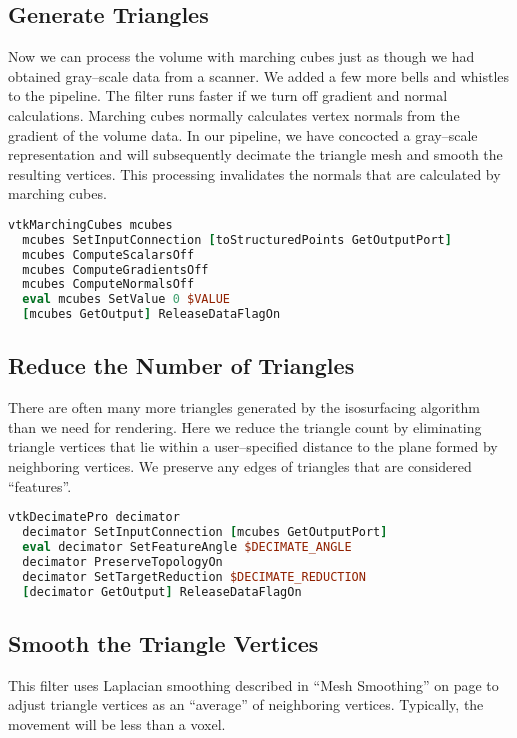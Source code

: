 \subsection{Generate Triangles}

Now we can process the volume with marching cubes just as though we had obtained gray--scale data from a scanner. We added a few more bells and whistles to the pipeline. The filter runs faster if we turn off gradient and normal calculations. Marching cubes normally calculates vertex normals from the gradient of the volume data. In our pipeline, we have concocted a gray--scale representation and will subsequently decimate the triangle mesh and smooth the resulting vertices. This processing invalidates the normals that are calculated by marching cubes. 

\begin{lstlisting}[language=TCL, caption={Generate Triangles.}]
vtkMarchingCubes mcubes
  mcubes SetInputConnection [toStructuredPoints GetOutputPort]
  mcubes ComputeScalarsOff
  mcubes ComputeGradientsOff
  mcubes ComputeNormalsOff
  eval mcubes SetValue 0 $VALUE
  [mcubes GetOutput] ReleaseDataFlagOn
\end{lstlisting}

\subsection{Reduce the Number of Triangles}
There are often many more triangles generated by the isosurfacing algorithm than we need for rendering. Here we reduce the triangle count by eliminating triangle vertices that lie within a user--specified distance to the plane formed by neighboring vertices. We preserve any edges of triangles that are considered ``features''.

\begin{lstlisting}[language=TCL, caption={Reduce the Number of Triangles.}]
vtkDecimatePro decimator
  decimator SetInputConnection [mcubes GetOutputPort]
  eval decimator SetFeatureAngle $DECIMATE_ANGLE
  decimator PreserveTopologyOn
  decimator SetTargetReduction $DECIMATE_REDUCTION
  [decimator GetOutput] ReleaseDataFlagOn
\end{lstlisting}

\subsection{Smooth the Triangle Vertices}

This filter uses Laplacian smoothing described in ``Mesh Smoothing'' on page \pageref{subsec:mesh_smoothing} to adjust triangle vertices as an ``average'' of neighboring vertices. Typically, the movement will be less than a voxel.

